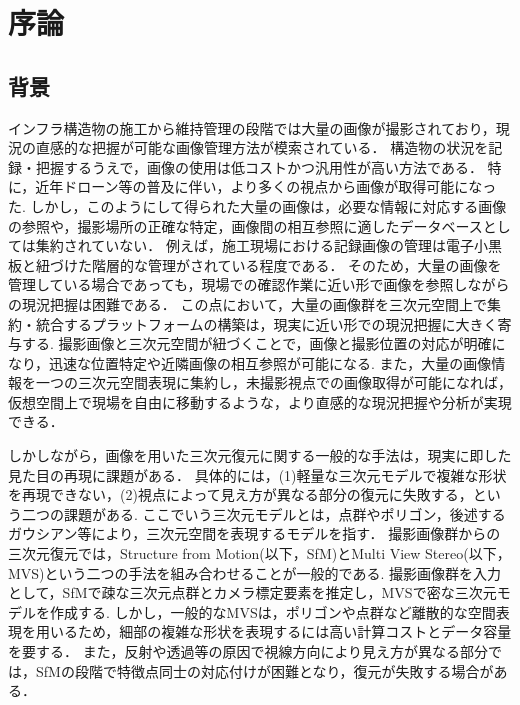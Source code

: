 \section{序論}\label{sec:intro}
\subsection{背景}\label{subsec:background}

インフラ構造物の施工から維持管理の段階では大量の画像が撮影されており，現況の直感的な把握が可能な画像管理方法が模索されている．
構造物の状況を記録・把握するうえで，画像の使用は低コストかつ汎用性が高い方法である．
特に，近年ドローン等の普及に伴い，より多くの視点から画像が取得可能になった. 
しかし，このようにして得られた大量の画像は，必要な情報に対応する画像の参照や，撮影場所の正確な特定，画像間の相互参照に適したデータベースとしては集約されていない．
例えば，施工現場における記録画像の管理は電子小黒板と紐づけた階層的な管理がされている程度\cite{kouji-shashin}である．
そのため，大量の画像を管理している場合であっても，現場での確認作業に近い形で画像を参照しながらの現況把握は困難である．
この点において，大量の画像群を三次元空間上で集約・統合するプラットフォームの構築は，現実に近い形での現況把握に大きく寄与する.
撮影画像と三次元空間が紐づくことで，画像と撮影位置の対応が明確になり，迅速な位置特定や近隣画像の相互参照が可能になる.
また，大量の画像情報を一つの三次元空間表現に集約し，未撮影視点での画像取得が可能になれば，仮想空間上で現場を自由に移動するような，より直感的な現況把握や分析が実現できる．\par

しかしながら，画像を用いた三次元復元に関する一般的な手法は，現実に即した見た目の再現に課題がある．
具体的には，(1)軽量な三次元モデルで複雑な形状を再現できない，(2)視点によって見え方が異なる部分の復元に失敗する，という二つの課題がある.
ここでいう三次元モデルとは，点群やポリゴン，後述するガウシアン等により，三次元空間を表現するモデルを指す．
撮影画像群からの三次元復元では，Structure from Motion(以下，SfM)とMulti View Stereo(以下，MVS)という二つの手法を組み合わせることが一般的である.
撮影画像群を入力として，SfMで疎な三次元点群とカメラ標定要素を推定し，MVSで密な三次元モデルを作成する.
しかし，一般的なMVSは，ポリゴンや点群など離散的な空間表現を用いるため，細部の複雑な形状を表現するには高い計算コストとデータ容量を要する．
また，反射や透過等の原因で視線方向により見え方が異なる部分では，SfMの段階で特徴点同士の対応付けが困難となり，復元が失敗する場合がある．\par

